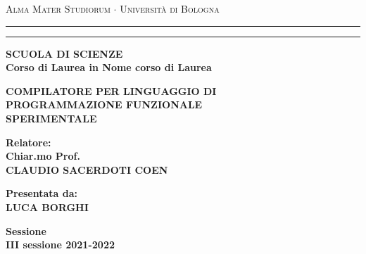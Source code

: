 \documentclass[10pt,a4paper]{article}
\begin{document}
\begin{titlepage}

\begin{center}

{{\Large {\textsc {Alma Mater Studiorum $\cdot$ Universit\`a di Bologna}}}} \rule[0.1cm]{15.8cm}{0.1mm}

\rule[0.5cm]{15.8cm}{0.6mm}
{\small {\bf SCUOLA DI SCIENZE\\
Corso di Laurea in Nome corso di Laurea }}

\end{center}

\vspace{15mm}
\begin{center}

{\LARGE
    {\bf COMPILATORE PER LINGUAGGIO DI}
}\\
\vspace{3mm}
{\LARGE
    {\bf PROGRAMMAZIONE FUNZIONALE}
}\\
\vspace{3mm}
{\LARGE
    {\bf SPERIMENTALE}
}\\

\end{center}

\vspace{40mm}
\par
\noindent
\begin{minipage}[t]{0.47\textwidth}

{\large
    {\bf Relatore:\\
        Chiar.mo Prof.\\
        CLAUDIO SACERDOTI COEN
    }
}

\end{minipage}

\hfill
\begin{minipage}[t] {0.47\textwidth}\raggedleft
{\large
    {\bf Presentata da:\\
        LUCA BORGHI
    }
}

\end{minipage}

\vspace{20mm}
\begin{center}

{\large
    {\bf Sessione\\
        III sessione
        2021-2022
    }
}%

\end{center}

\end{titlepage}
\end{document}
